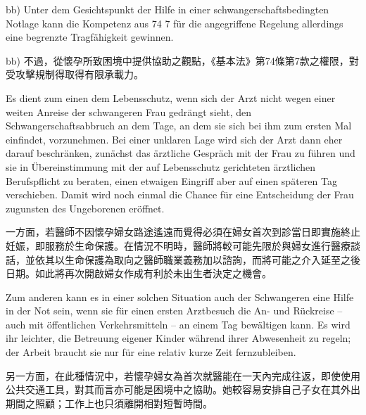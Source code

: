 \documentclass[12pt]{article}
\begin{document}
\begin{sourcepara}[title={原文E.242}]
bb) Unter dem Gesichtspunkt der Hilfe in einer schwangerschaftsbedingten Notlage kann die Kompetenz aus \abbrArt{} 74 \abbrNr{} 7 \abbrGG{}\ggfnArtSeventyFourSevenDE{} für die angegriffene Regelung allerdings eine begrenzte Tragfähigkeit gewinnen.
\end{sourcepara}
\begin{transpara}
bb) 不過，從懷孕所致困境中提供協助之觀點，《基本法》第74條第7款\ggfnArtSeventyFourSevenZH{}之權限，對受攻擊規制得取得有限承載力。
\end{transpara}

\begin{sourcepara}[title={原文E.243}]
Es dient zum einen dem Lebensschutz, wenn sich der Arzt nicht wegen einer weiten Anreise der schwangeren Frau gedrängt sieht, den Schwangerschaftsabbruch an dem Tage, an dem sie sich bei ihm zum ersten Mal einfindet, vorzunehmen. Bei einer unklaren Lage wird sich der Arzt dann eher darauf beschränken, zunächst das ärztliche Gespräch mit der Frau zu führen und sie in Übereinstimmung mit der auf Lebensschutz gerichteten ärztlichen Berufspflicht zu beraten, einen etwaigen Eingriff aber auf einen späteren Tag verschieben. Damit wird noch einmal die Chance für eine Entscheidung der Frau zugunsten des Ungeborenen eröffnet.
\end{sourcepara}
\begin{transpara}
一方面，若醫師不因懷孕婦女路途遙遠而覺得必須在婦女首次到診當日即實施終止妊娠，即服務於生命保護。在情況不明時，醫師將較可能先限於與婦女進行醫療談話，並依其以生命保護為取向之醫師職業義務加以諮詢，而將可能之介入延至之後日期。如此將再次開啟婦女作成有利於未出生者決定之機會。
\end{transpara}

\begin{sourcepara}[title={原文E.244}]
Zum anderen kann es in einer solchen Situation auch der Schwangeren eine Hilfe in der Not sein, wenn sie für einen ersten Arztbesuch die An- und Rückreise -- auch mit öffentlichen Verkehrsmitteln -- an einem Tag bewältigen kann. Es wird ihr leichter, die Betreuung eigener Kinder während ihrer Abwesenheit zu regeln; der Arbeit braucht sie nur für eine relativ kurze Zeit fernzubleiben.
\end{sourcepara}
\begin{transpara}
另一方面，在此種情況中，若懷孕婦女為首次就醫能在一天內完成往返，即使使用公共交通工具，對其而言亦可能是困境中之協助。她較容易安排自己子女在其外出期間之照顧；工作上也只須離開相對短暫時間。
\end{transpara}
\end{document}

